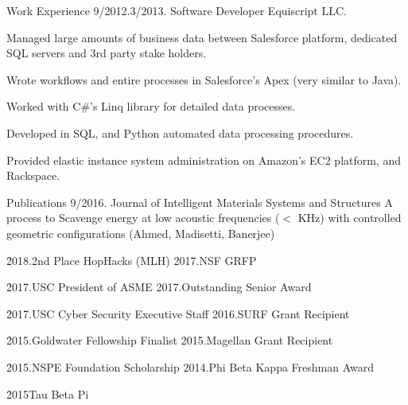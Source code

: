 \documentclass[letter,10pt]{dresume}
\begin{document}
\begin{sblock}{Work Experience}
  \experience%
    {9/2012.}{3/2013.}%
    {Software Developer}%
    {Equiscript LLC.}

      \item Managed large amounts of business data between Salesforce platform,
        dedicated SQL servers and 3rd party stake holders.
      \item Wrote workflows and entire processes in Salesforce’s Apex (very
        similar to Java).
      \item Worked with C\#’s Linq library for detailed data processes.
      \item Developed in SQL, and Python automated data processing procedures.
      \item Provided elastic instance system administration on Amazon’s EC2
        platform, and Rackspace.
  \endexperience

\end{sblock}

\begin{sblock}{Publications}
  \pub%
    {9/2016.}%
    {Journal of Intelligent Materials Systems and Structures}%
    {A process to Scavenge energy at low acoustic frequencies ($<$ KHz) with
    controlled geometric configurations (Ahmed, Madisetti, Banerjee)}
\end{sblock}

  \h%
    {2018.}{2nd Place HopHacks (MLH)}%
    {2017.}{NSF GRFP}

  \h%
    {2017.}{USC President of ASME}%
    {2017.}{Outstanding Senior Award}

  \h%
    {2017.}{USC Cyber Security Executive Staff}%
    {2016.}{SURF Grant Recipient}

  \h%
    {2015.}{Goldwater Fellowship Finalist}%
    {2015.}{Magellan Grant Recipient}

  \h%
    {2015.}{NSPE Foundation Scholarship}%
    {2014.}{Phi Beta Kappa Freshman Award}

  \h%
    {2015}{Tau Beta Pi}%
    {}{}

\endhblock
\end{document}
